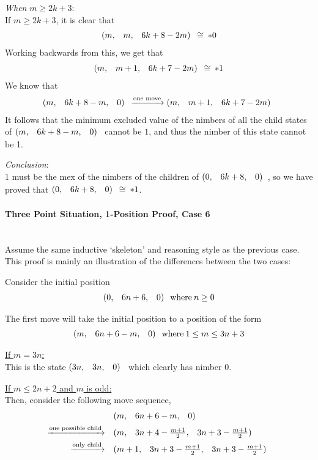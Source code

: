 \documentclass{article}
\makeatletter
\newcommand{\game}[3]{\begin{array}{@{}*6r}(#1, & #2, & #3)\end{array}}
\newcommand{\gcong}{\cong\:}
\makeatother
\begin{document}
\bigskip
\textit{When} $m \geq 2k + 3$:\\
If $m \geq 2k + 3$, it is clear that
\begin{equation*}
  \game{m}{m}{6k+8-2m} \gcong *0
\end{equation*}
Working backwards from this, we get that
\begin{equation*}
  \game{m}{m+1}{6k+7-2m} \gcong *1
\end{equation*}
We know that
\begin{equation*}
  \game{m}{6k+8-m}{0} \xrightarrow{\text{one move}}
  \game{m}{m+1}{6k+7-2m}
\end{equation*}
It follows that the minimum excluded value of the nimbers of
all the child states of $\game{m}{6k+8-m}{0}$ cannot be $1$, and
thus the nimber of this state cannot be 1.

\bigskip
\textit{Conclusion}:\\
$1$ must be the mex of the nimbers of the children of $\game{0}{6k+8}{0}$,
so we have proved that $\game{0}{6k+8}{0} \gcong *1$.
\newpage

\paragraph{Three Point Situation, 1-Position Proof, Case 6}\mbox{}\\
Assume the same inductive `skeleton' and reasoning style as the previous case.
This proof is mainly an illustration of the differences between the two cases:

\bigskip
Consider the initial position
\begin{equation*}
  \game{0}{6n+6}{0} \: \text{where} \: n \geq 0
\end{equation*}

\medskip
The first move will take the initial position to a position of the form
\begin{equation*}
  \game{m}{6n+6-m}{0} \: \text{where} \: 1 \leq m \leq 3n+3
\end{equation*}

\bigskip
\underline{If $m = 3n$:} \\
This is the state $\game{3n}{3n}{0}$ which clearly has nimber $0$.

\bigskip
\underline{If $m \leq 2n + 2$ and $m$ is odd:} \\
Then, consider the following move sequence,
\begin{align*}
  & \game{m}{6n+6-m}{0} \\
  \xrightarrow{\text{one possible child}} \quad & 
  \game{m}{3n+4-\frac{m+1}{2}}{3n+3-\frac{m+1}{2}} \\
  \xrightarrow{\text{only child}} \quad & 
  \game{m+1}{3n+3-\frac{m+1}{2}}{3n+3-\frac{m+1}{2}} \\
\end{align*}
\end{document}
